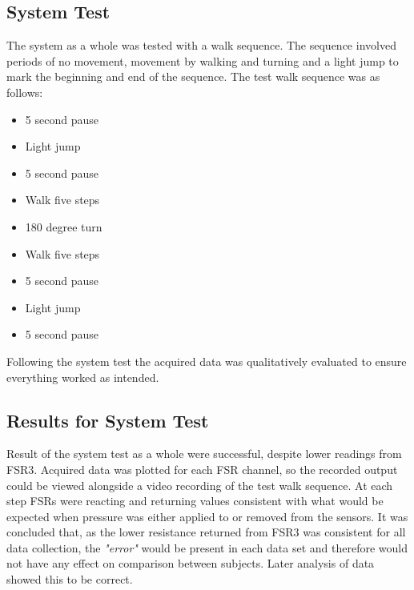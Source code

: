 \subsection{System Test}
The system as a whole was tested with a walk sequence. The sequence involved periods of no movement, movement by walking and turning and a light jump to mark the beginning and end of the sequence. The test walk sequence was as follows:
\vspace{-0.6cm}
\begin{itemize}
	\item 5 second pause
	\vspace{-0.3cm}
	\item Light jump
	\vspace{-0.3cm}
	\item 5 second pause
	\vspace{-0.3cm}
	\item Walk five steps
	\vspace{-0.3cm}
	\item 180 degree turn
	\vspace{-0.3cm}
	\item Walk five steps
	\vspace{-0.3cm}
	\item 5 second pause
	\vspace{-0.3cm}
	\item Light jump
	\vspace{-0.3cm}
	\item 5 second pause
\end{itemize}
\vspace{-0.4cm}
Following the system test the acquired data was qualitatively evaluated to ensure everything worked as intended. 

\subsection{Results for System Test}
Result of the system test as a whole were successful, despite lower readings from FSR3. Acquired data was plotted for each FSR channel, so the recorded output could be viewed alongside a video recording of the test walk sequence. At each step FSRs were reacting and returning values consistent with what would be expected when pressure was either applied to or removed from the sensors. 
It was concluded that, as the lower resistance returned from FSR3 was consistent for all data collection, the \textit{"error"} would be present in each data set and therefore would not have any effect on comparison between subjects. Later analysis of data showed this to be correct.

